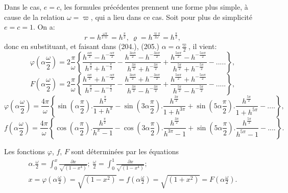 \documentclass{article}
\begin{document}
Dans le cas, $e=c$, les formules précédentes prennent une forme plus simple, à cause de la relation $\omega=\varpi$, qui a lieu dans ce cas. Soit pour plus de simplicité $e=c=1$. On a:
\[
r = h^{\frac{\omega\pi}{2\varpi}} = h^{\frac{\pi}{2}},\ \varrho = h^{\frac{\varpi\pi}{2\omega}} = h^{\frac{\pi}{2}},
\]
donc en substituant, et faisant dans (204.), (205.) $\alpha=\alpha\frac{\varpi}{2}$, il vient:
\[
\varphi\left(\alpha\frac{\omega}{2}\right) = 2\frac{\pi}{\omega}\left\{\frac{h^{\frac{\alpha\pi}{2}}-h^{-\frac{\alpha\pi}{2}}}{h^{\frac{\pi}{2}}+h^{-\frac{\pi}{2}}}-\frac{h^{\frac{3\alpha\pi}{2}}-h^{-\frac{3\alpha\pi}{2}}}{h^{\frac{3\pi}{2}}+h^{-\frac{3\pi}{2}}}+\frac{h^{\frac{5\alpha\pi}{2}}-h^{-\frac{5\alpha\pi}{2}}}{h^{\frac{5\pi}{2}}+h^{-\frac{5\pi}{2}}}-.....\right\},
\]
\[
F\left(\alpha\frac{\omega}{2}\right) = 2\frac{\pi}{\omega}\left\{\frac{h^{\frac{\alpha\pi}{2}}+h^{-\frac{\alpha\pi}{2}}}{h^{\frac{\pi}{2}}-h^{-\frac{\pi}{2}}}-\frac{h^{\frac{3\alpha\pi}{2}}+h^{-\frac{3\alpha\pi}{2}}}{h^{\frac{3\pi}{2}}-h^{-\frac{3\pi}{2}}}+\frac{h^{\frac{5\alpha\pi}{2}}+h^{-\frac{5\alpha\pi}{2}}}{h^{\frac{5\pi}{2}}-h^{-\frac{5\pi}{2}}}-.....\right\},
\]
\[
\varphi\left(\alpha\frac{\omega}{2}\right) = \frac{4\pi}{\omega}\left\{\sin\left(\alpha\frac{\pi}{2}\right).\frac{h^{\frac{\pi}{2}}}{1+h^{\pi}}-\sin\left(3\alpha\frac{\pi}{2}\right).\frac{h^{\frac{3\pi}{2}}}{1+h^{3\pi}}+\sin\left(5\alpha\frac{\pi}{2}\right).\frac{h^{\frac{5\pi}{2}}}{1+h^{5\pi}}-....\right\},
\]
\[
f\left(\alpha\frac{\omega}{2}\right) = \frac{4\pi}{\omega}\left\{\cos\left(\alpha\frac{\pi}{2}\right).\frac{h^{\frac{\pi}{2}}}{h^{\pi}-1}-\cos\left(3\alpha\frac{\pi}{2}\right).\frac{h^{\frac{3\pi}{2}}}{h^{3\pi}-1}+\sin\left(5\alpha\frac{\pi}{2}\right).\frac{h^{\frac{5\pi}{2}}}{h^{5\pi}-1}-....\right\}.
\]

Les fonctions $\varphi$, $f$, $F$ sont déterminées par les équations
\[
\begin{gathered}
\alpha.\frac{\omega}{2} = \int_{0}^{x}\frac{\partial x}{\sqrt{(1-x^{4})}};\ \frac{\omega}{2} = \int_{0}^{1}\frac{\partial x}{\sqrt{(1-x^{4})}};\\
x = \varphi\left(\alpha\frac{\omega}{2}\right) = \sqrt{(1-x^{2})} = f\left(\alpha\frac{\omega}{2}\right) = \sqrt{(1+x^{2})} = F\left(\alpha\frac{\omega}{2}\right).
\end{gathered}
\]
\end{document}
